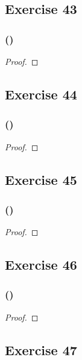 \documentclass[14pt]{extarticle}
\begin{document}
\subsection{Exercise 43}

\subsubsection{()}

\begin{proof}

\end{proof}

\subsection{Exercise 44}

\subsubsection{()}

\begin{proof}

\end{proof}

\subsection{Exercise 45}

\subsubsection{()}

\begin{proof}

\end{proof}

\subsection{Exercise 46}

\subsubsection{()}

\begin{proof}

\end{proof}

\subsection{Exercise 47}
\end{document}
